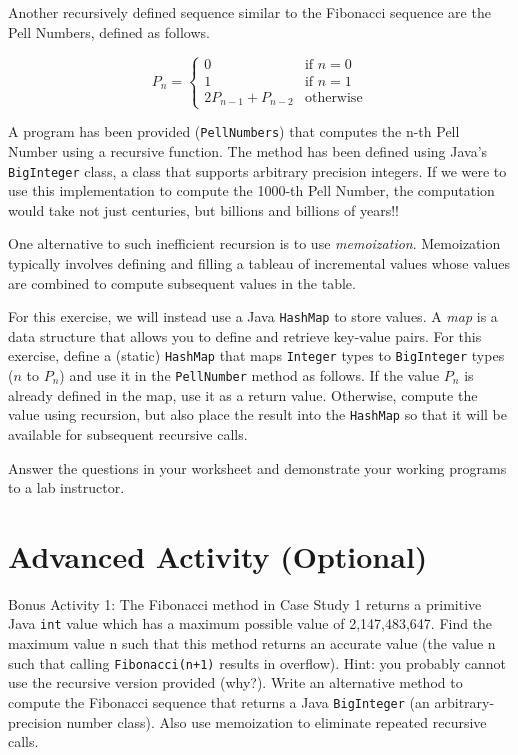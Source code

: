 \documentclass[12pt]{scrartcl}
\begin{document}
Another recursively defined sequence similar to the Fibonacci 
sequence are the Pell Numbers, defined as follows.

$$P_n = \left\{
\begin{array}{ll}
0 & \textrm{if } n=0 \\
1 & \textrm{if } n=1 \\
2P_{n-1}+P_{n-2} & \textrm{otherwise}
\end{array}
\right.$$
 
A program has been provided (\texttt{PellNumbers}) that 
computes the n-th Pell Number using a recursive function.  The method 
has been defined using Java's \texttt{BigInteger} class, 
a class that supports arbitrary precision integers.  If we were to 
use this implementation to compute the 1000-th Pell Number, the 
computation would take not just centuries, but billions and billions 
of years!!

One alternative to such inefficient recursion is to use \emph{memoization}.  
Memoization typically involves defining and filling a tableau of 
incremental values whose values are combined to compute subsequent 
values in the table.  

For this exercise, we will instead use a Java \texttt{HashMap} 
to store values.  A \emph{map} is a data structure that allows you 
to define and retrieve key-value pairs.  For this exercise, define 
a (static) \texttt{HashMap} that maps \texttt{Integer} types to \texttt{BigInteger} types ($n$ to $P_n$) and use 
it in the \texttt{PellNumber} method as follows.  If
the value $P_n$ is already defined in the map, use it as a return 
value.  Otherwise, compute the value using recursion, but also place 
the result into the \texttt{HashMap} so that it will be 
available for subsequent recursive calls.

Answer the questions in your worksheet and demonstrate your working 
programs to a lab instructor.

\section*{Advanced Activity (Optional)}

Bonus Activity 1: The Fibonacci method in Case Study 1 returns a 
primitive Java \texttt{int} value which has a maximum 
possible value of 2,147,483,647.  Find the maximum value n such 
that this method returns an accurate value (the value n such that 
calling \texttt{Fibonacci(n+1)} results in overflow).  
Hint: you probably cannot use the recursive version provided 
(why?).  Write an alternative method to compute the Fibonacci 
sequence that returns a Java \texttt{BigInteger} (an 
arbitrary-precision number class).  Also use memoization to 
eliminate repeated recursive calls.
\end{document}
